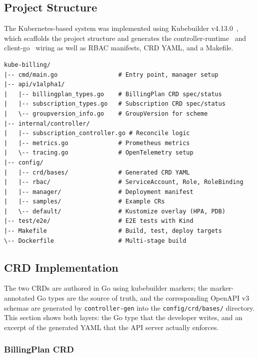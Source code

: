 \subsection{Project Structure}

The Kubernetes-based system was implemented using Kubebuilder v4.13.0~\cite{kubebuilder}, which scaffolds the project structure and generates the controller-runtime~\cite{controller_runtime} and client-go~\cite{client_go} wiring as well as RBAC manifests, CRD YAML, and a Makefile.

\begin{lstlisting}[caption={kube-billing project structure}, label={lst:kube-structure}]
kube-billing/
|-- cmd/main.go                 # Entry point, manager setup
|-- api/v1alpha1/
|   |-- billingplan_types.go    # BillingPlan CRD spec/status
|   |-- subscription_types.go   # Subscription CRD spec/status
|   \-- groupversion_info.go    # GroupVersion for scheme
|-- internal/controller/
|   |-- subscription_controller.go # Reconcile logic
|   |-- metrics.go              # Prometheus metrics
|   \-- tracing.go              # OpenTelemetry setup
|-- config/
|   |-- crd/bases/              # Generated CRD YAML
|   |-- rbac/                   # ServiceAccount, Role, RoleBinding
|   |-- manager/                # Deployment manifest
|   |-- samples/                # Example CRs
|   \-- default/                # Kustomize overlay (HPA, PDB)
|-- test/e2e/                   # E2E tests with Kind
|-- Makefile                    # Build, test, deploy targets
\-- Dockerfile                  # Multi-stage build
\end{lstlisting}

\subsection{CRD Implementation}

The two CRDs are authored in Go using kubebuilder markers; the marker-annotated Go types are the source of truth, and the corresponding OpenAPI v3 schemas are generated by \texttt{controller-gen} into the \texttt{config/crd/bases/} directory. This section shows both layers: the Go type that the developer writes, and an excerpt of the generated YAML that the API server actually enforces.

\subsubsection{BillingPlan CRD}

